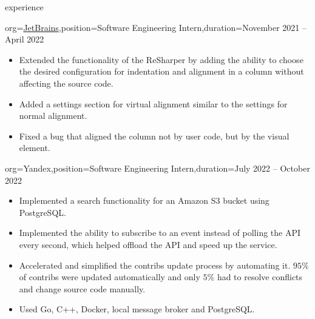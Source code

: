 \documentclass{resume}
\begin{document}
\begin{ResumeSection}{experience}
    \begin{ResumeSubsection}{org=\href{https://www.jetbrains.com/}{JetBrains},position={Software Engineering Intern},duration=November 2021 – April 2022}
        \begin{itemize}
            \item {
                Extended the functionality of the ReSharper by adding the ability to choose the desired configuration for indentation and alignment in a column without affecting the source code.
            }

            \item {
                Added a settings section for virtual alignment similar to the settings for normal alignment.
            }

            \item {
                Fixed a bug that aligned the column not by user code, but by the visual element.
            }
        \end{itemize}
    \end{ResumeSubsection}

    \begin{ResumeSubsection}{org=Yandex,position={Software Engineering Intern},duration=July 2022 – October 2022}
        \begin{itemize}
            \item {
                Implemented a search functionality for an Amazon S3 bucket using PostgreSQL.
            }

            \item {
                Implemented the ability to subscribe to an event instead of polling the API every second, which helped offload the API and speed up the service.
            }

            \item {
                Accelerated and simplified the contribs update process by automating it. $95\%$ of contribs were updated automatically and only $5\%$ had to resolve conflicts and change source code manually.
            }

            \item {
                Used Go, C++, Docker, local message broker and PostgreSQL.
            }
        \end{itemize}
    \end{ResumeSubsection}
\end{ResumeSection}
\end{document}
